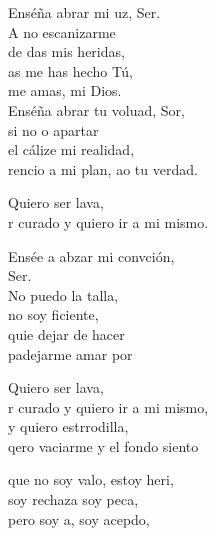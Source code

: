 \begin{cancion}[Resucitados][]%
	Enséña abrar mi uz, Ser. \\
	A no escanizarme \\
	de das mis heridas, \\
	as me has hecho Tú, \\
	 me amas, mi Dios.  \\
	Enséña abrar tu voluad, Sor,  \\
	si no o apartar \\
	el cálize mi realidad, \\
	rencio a mi plan, ao tu verdad. \jump\\
	\begin{chorus}%
		Quiero  ser lava, \\
		r curado y quiero ir a mi mismo. \jump\\
	\end{chorus}%
	Ensée a abzar mi convción, \\
	Ser. \\
	No puedo la talla, \\
	no soy ficiente, \\
	quie dejar de hacer \\
	padejarme amar por  \jump\\
	\begin{chorus}%
		Quiero  ser lava\chord{Fa}{}{do}, \\
		r curado y quiero ir a mi mismo, \\
		y quiero estrrodilla,  \\
		qero vaciarme y el fondo siento\jump\\
	\end{chorus}%
	que no soy valo, estoy heri, \\
	soy rechaza soy peca, \\
	\jump
	pero soy a, soy acepdo, \\

\end{cancion}
